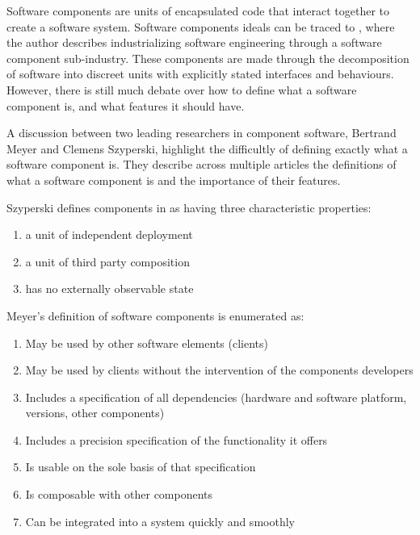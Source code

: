 Software components are units of encapsulated code that interact together to create a software system.
Software components ideals can be traced to \cite{McIlroy1969}, where the author describes industrializing software engineering through a software component sub-industry. 
These components are made through the decomposition of software into discreet units with explicitly stated interfaces and behaviours.
However, there is still much debate over how to define what a software component is, and what features it should have.

A discussion between two leading researchers in component software, Bertrand Meyer and Clemens Szyperski, highlight the difficultly of defining exactly what a software component is. 
They describe across multiple articles \cite{Meyer1999,Szyperski2000a, Szyperski2000, Meyer2000} the definitions of what a software component is and the importance of their features.

Szyperski defines components in \cite{Szyperski2002} as having three characteristic properties:
\begin{enumerate}
  \item a unit of independent deployment
  \item a unit of third party composition
  \item has no externally observable state
\end{enumerate}

Meyer's definition of software components is enumerated as:
\begin{enumerate}
  \item May be used by other software elements (clients)
  \item May be used by clients without the intervention of the components developers
  \item Includes a specification of all dependencies (hardware and software platform, versions, other components)
  \item Includes a precision specification of the functionality it offers
  \item Is usable on the sole basis of that specification
  \item Is composable with other components
  \item Can be integrated into a system quickly and smoothly
\end{enumerate}


